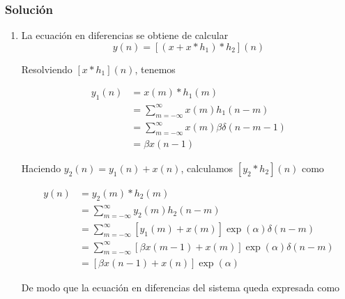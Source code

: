 \documentclass[a4paper,12pt,final]{article}
\begin{document}
    \subsubsection*{Solución}
      \begin{enumerate}[label=\alph*)]
        \item La ecuación en diferencias se obtiene de calcular
          $$ y\left(n\right) = \left[\left(x + x*h_1\right)*h_2\right]\left(n\right) $$

          \noindent Resolviendo $\left[x*h_1\right]\left(n\right)$, tenemos

          \begin{equation*}
            \begin{split}
              y_1\left(n\right) & = x(m)*h_1(m) \\
                                & = \sum_{m=-\infty}^{\infty} x\left(m\right)h_1\left(n-m\right) \\
                                & = \sum_{m=-\infty}^{\infty} x\left(m\right)\beta\delta\left(n-m-1\right) \\
                                & = \beta x\left(n-1\right)
            \end{split}
          \end{equation*}

          \noindent Haciendo $y_2\left(n\right)=y_1\left(n\right) + x\left(n\right)$, calculamos $\left[y_2*h_2\right]\left(n\right)$ como

          \begin{equation*}
            \begin{split}
              y\left(n\right) & = y_2(m)*h_2(m) \\
                              & = \sum_{m=-\infty}^{\infty} y_2(m)h_2\left(n-m\right) \\
                              & = \sum_{m=-\infty}^{\infty} \left[y_1\left(m\right) + x\left(m\right)\right]\exp\left(\alpha\right)\delta\left(n-m\right) \\
                              & = \sum_{m=-\infty}^{\infty} \left[\beta x\left(m-1\right) + x\left(m\right)\right]\exp\left(\alpha\right)\delta\left(n-m\right) \\
                              & = \left[\beta x\left(n-1\right) + x\left(n\right)\right]\exp\left(\alpha\right)
            \end{split}
          \end{equation*}

          \noindent De modo que la ecuación en diferencias del sistema queda expresada como


\end{enumerate}
\end{document}
